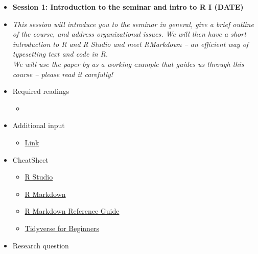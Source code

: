 \documentclass{article}
\begin{document}
\begin{itemize}
\vspace*{0.04in}
\noindent\rule{16cm}{0.7pt}
\vspace*{-0.45in}
\item[] \textbf{Session 1: Introduction to the seminar and intro to R I (DATE)} 
\item[]\textit{This session will introduce you to the seminar in general, give a brief outline of the course, and address organizational issues. We will then have a short introduction to \textsf{R} and \textsf{R} Studio and meet \textsf{R}Markdown -- an efficient way of typesetting text and code in \textsf{R}.\\
We will use the paper by \textcite{hultman2014beyond} as a working example that guides us through this course -- please read it carefully!}
\item[] \faBook \space Required readings
\begin{itemize} 
\item[$\square$] 
\end{itemize}
{\color{darkgray}}
\item[] \faEdit \space Additional input 
\begin{itemize} 
\item[$\square$] \href{url}{Link}
\end{itemize}
\item[] \faLightbulbO \space CheatSheet
\begin{itemize} 
\item[$\square$] \href{https://github.com/rstudio/cheatsheets/raw/master/rstudio-ide.pdf}{\textsf{R} Studio}
\item[$\square$] \href{https://github.com/rstudio/cheatsheets/raw/master/rmarkdown-2.0.pdf}{\textsf{R} Markdown}
\item[$\square$] \href{http://442r58kc8ke1y38f62ssb208-wpengine.netdna-ssl.com/wp-content/uploads/2015/03/rmarkdown-reference.pdf}{\textsf{R} Markdown Reference Guide}
\item[$\square$] \href{https://bit.ly/31qRe28}{Tidyverse for Beginners}
\end{itemize}
\item[] \faExclamation \space 
\space Research question


\end{itemize}
\end{document}
